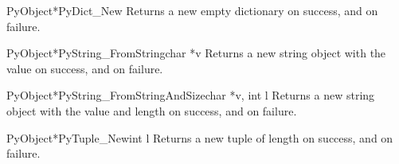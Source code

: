      \begin{cfuncdesc}{PyObject*}{PyDict_New}{}
	 Returns a new empty dictionary on success, and {\NULL} on
	 failure.
     \end{cfuncdesc}

     \begin{cfuncdesc}{PyObject*}{PyString_FromString}{char *v}
	 Returns a new string object with the value  on success, and
	 {\NULL} on failure.
     \end{cfuncdesc}

     \begin{cfuncdesc}{PyObject*}{PyString_FromStringAndSize}{char *v, int l}
	 Returns a new string object with the value  and length 
	 on success, and {\NULL} on failure.
     \end{cfuncdesc}

     \begin{cfuncdesc}{PyObject*}{PyTuple_New}{int l}
	 Returns a new tuple of length  on success, and {\NULL} on
	 failure.
     \end{cfuncdesc}

